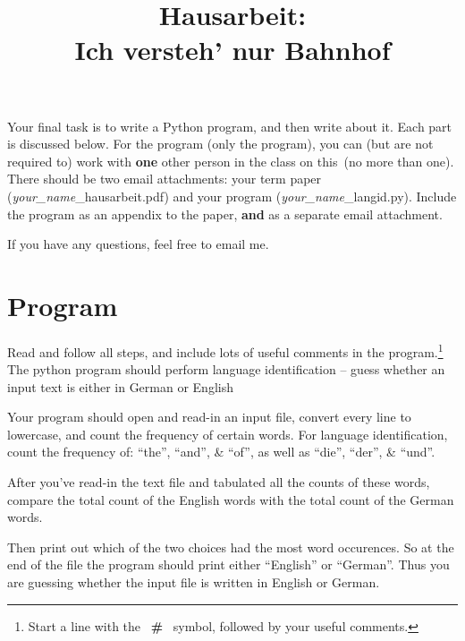 \documentclass[11pt]{article}
\title{Hausarbeit: \\ {\large Ich versteh' nur Bahnhof}}
\begin{document}
\maketitle


\begin{spacing}{1.35}


Your final task is to write a Python program, and then write about it.
Each part is discussed below.
For the program (only the program), you can (but are not required to) work with \textbf{one} other person in the class on this~(no more than one).
There should be two email attachments: your term paper (\textit{your\_name}\_hausarbeit.pdf) and your program (\textit{your\_name}\_langid.py).
Include the program as an appendix to the paper, \textbf{and} as a separate email attachment.

If you have any questions, feel free to email me.

\section{Program}
{Read and follow all steps}, and include lots of useful comments in the program.\footnote{Start a line with the \, \textbf{\#} \, symbol, followed by your useful comments.}
The python program should perform language identification -- guess whether an input text is either in German or English

Your program should open and read-in an input file, convert every line to lowercase, and count the frequency of certain words.
For language identification, count the frequency of: ``the'', ``and'', \& ``of'', as well as ``die'', ``der'', \& ``und''.


After you've read-in the text file and tabulated all the counts of these words, compare the total count of the English words with the total count of the German words.

Then print out which of the two choices had the most word occurences.
So at the end of the file the program should print either ``English'' or ``German''.
Thus you are guessing whether the input file is written in English or German.



\end{spacing}
\end{document}
